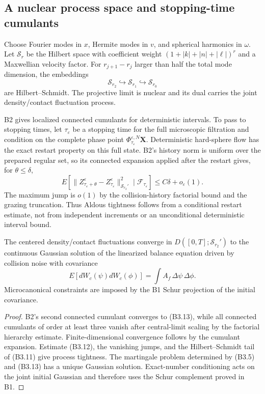 \subsection{A nuclear process space and stopping-time cumulants}

Choose Fourier modes in $x$, Hermite modes in $v$, and spherical harmonics in
$\omega$.  Let $\mathcal S_r$ be the Hilbert space with coefficient weight
$(1+|k|+|n|+|\ell|)^{r}$ and a Maxwellian velocity factor.  For
$r_{j+1}-r_j$ larger than half the total mode dimension, the embeddings
\[
 \mathcal S_{r_2}\hookrightarrow\mathcal S_{r_1}
 \hookrightarrow\mathcal S_{r_0}                         \tag{B3.11}
\]
are Hilbert--Schmidt.  The projective limit is nuclear and its dual carries
the joint density/contact fluctuation process.

B2 gives localized connected cumulants for deterministic intervals.  To pass
to stopping times, let $\tau_\varepsilon$ be a stopping time for the full
microscopic filtration and condition on the complete phase point
$\Phi_{\tau_\varepsilon}^{\varepsilon,N}\mathbf X$.  Deterministic
hard-sphere flow has the exact restart property on this full state.  B2's
history norm is uniform over the prepared regular set, so its connected
expansion applied after the restart gives, for $\theta\le\delta$,
\[
 E\left[
 \|Z^\varepsilon_{\tau_\varepsilon+\theta}
       -Z^\varepsilon_{\tau_\varepsilon}\|_{\mathcal S_{r_2}'}^2
 \mid\mathcal F_{\tau_\varepsilon}\right]
 \le C\delta+o_\varepsilon(1).                           \tag{B3.12}
\]
The maximum jump is $o(1)$ by the collision-history factorial bound and the
grazing truncation.  Thus Aldous tightness follows from a conditional restart
estimate, not from independent increments or an unconditional deterministic
interval bound.

\begin{theorem}
\label{thm:r23-b3-clt}
The centered density/contact fluctuations converge in
$D([0,T];\mathcal S_{r_2}')$ to the continuous Gaussian solution of the
linearized balance equation driven by collision noise with covariance
\[
 E[dW_c(\psi)dW_c(\phi)]
 =\int A_f\,\Delta\psi\,\Delta\phi.                      \tag{B3.13}
\]
Microcanonical constraints are imposed by the B1 Schur projection of the
initial covariance.
\end{theorem}

\begin{proof}
B2's second connected cumulant converges to (B3.13), while all connected
cumulants of order at least three vanish after central-limit scaling by the
factorial hierarchy estimate.  Finite-dimensional convergence follows by the
cumulant expansion.  Estimate (B3.12), the vanishing jumps, and the
Hilbert--Schmidt tail of (B3.11) give process tightness.  The martingale
problem determined by (B3.5) and (B3.13) has a unique Gaussian solution.
Exact-number conditioning acts on the joint initial Gaussian and therefore
uses the Schur complement proved in B1.
\end{proof}

